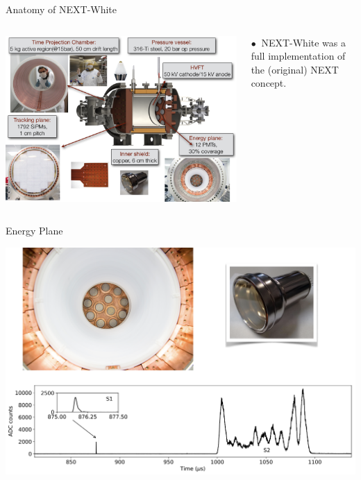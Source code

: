 \documentclass [aspectratio=169]{beamer}
\begin{document}
\begin{frame}{Anatomy of NEXT-White}

\begin{columns}
\includegraphics[scale=0.21]{whitecollage.png}

$\bullet~$ NEXT-White was a full implementation of the (original) NEXT concept. 

\end{columns}
\end{frame}

\begin{frame}{Energy Plane}

\includegraphics[scale=0.25]{energyPlane.png}

\end{frame}
\end{document}
